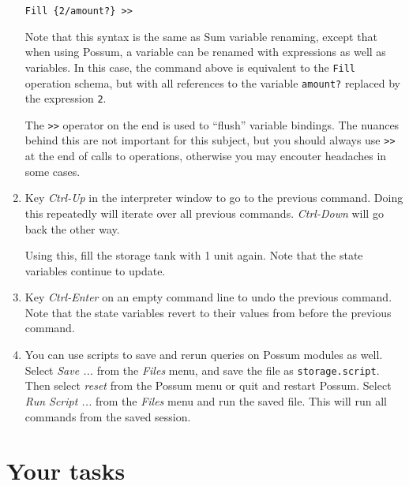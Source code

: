\documentclass{article}
\begin{document}
\begin{enumerate}
\quad\quad \texttt{Fill \{2/amount?\} >>}

Note that this syntax is the same as Sum variable renaming, except that when using Possum, a variable can be renamed with expressions as well as variables. In this case, the command above is equivalent to the \texttt{Fill} operation schema, but with all references to the variable \texttt{amount?} replaced by the expression \texttt{2}.

The \texttt{>>} operator on the end is used to ``flush'' variable bindings. The nuances behind this are not important for this subject, but you should always use \texttt{>>} at the end of calls to operations, otherwise you may encouter headaches in some cases.

\item Key \emph{Ctrl-Up} in the interpreter window to go to the previous command. Doing this repeatedly will iterate over all previous commands. \emph{Ctrl-Down} will go back the other way.

Using this, fill the storage tank with 1 unit again. Note that the state variables continue to update.

\item Key \emph{Ctrl-Enter} on an empty command line to undo the previous command. Note that the state variables revert to their values from before the previous command.

\item You can use scripts to save and rerun queries on Possum modules as well. Select \emph{Save ...} from the \emph{Files} menu, and save the file as \texttt{storage.script}. Then select \emph{reset} from the Possum menu or quit and restart Possum. Select \emph{Run Script ...} from the \emph{Files} menu and run the saved file. This will run all commands from the saved session.

\end{enumerate}

\section*{Your tasks}
\end{document}
